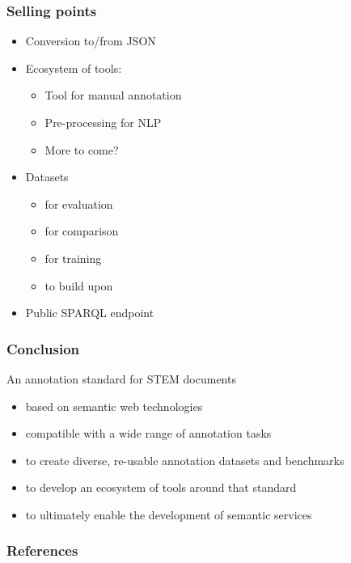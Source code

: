 \documentclass[aspectratio=169]{beamer}
\begin{document}
\begin{frame}
    \frametitle{Selling points}
    \begin{itemize}
        \item Conversion to/from JSON
        \item Ecosystem of tools:
            \begin{itemize}
                \item Tool for manual annotation
                \item Pre-processing for NLP
                \item More to come?
            \end{itemize}
        \item Datasets
            \begin{itemize}
                \item for evaluation
                \item for comparison
                \item for training
                \item to build upon
            \end{itemize}
        \item Public SPARQL endpoint
    \end{itemize}
\end{frame}


\begin{frame}
    \frametitle{Conclusion}
    An annotation standard for STEM documents
    \begin{itemize}
        \item based on semantic web technologies
        \item compatible with a wide range of annotation tasks
        \item to create diverse, re-usable annotation datasets and benchmarks
        \item to develop an ecosystem of tools around that standard
        \item to ultimately enable the development of semantic services
    \end{itemize}
\end{frame}

\appendix   %

\begin{frame}[allowframebreaks,t]
    \frametitle{References}
    \printbibliography
\end{frame}
\end{document}
